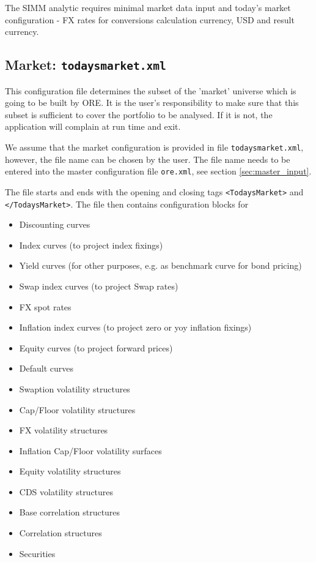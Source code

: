 \documentclass[12pt, a4paper]{article}
\begin{document}
The SIMM analytic requires minimal market data input and today's market configuration - FX rates for conversions calculation currency, USD and result currency.

\subsection{Market: {\tt todaysmarket.xml}}\label{sec:market}

This configuration file determines the subset of the 'market' universe which is going to be built by ORE. It is the
user's responsibility to make sure that this subset is sufficient to cover the portfolio to be analysed. If it is not,
the application will complain at run time and exit.

\medskip We assume that the market configuration is provided in file {\tt todaysmarket.xml}, however, the file name can
be chosen by the user. The file name needs to be entered into the master configuration file {\tt ore.xml}, see section
\ref{sec:master_input}.

\medskip 
The file starts and ends with the opening and closing tags {\tt <TodaysMarket>} 
and {\tt </TodaysMarket>}. The file then contains configuration blocks for
\begin{itemize}
\item Discounting curves
\item Index curves (to project index fixings)
\item Yield curves (for other purposes, e.g. as benchmark curve for bond pricing)
\item Swap index curves (to project Swap rates)
\item FX spot rates
\item Inflation index curves (to project zero or yoy inflation fixings)
\item Equity curves (to project forward prices)
\item Default curves
\item Swaption volatility structures
\item Cap/Floor volatility structures
\item FX volatility structures
\item Inflation Cap/Floor volatility surfaces
\item Equity volatility structures
\item CDS volatility structures
\item Base correlation structures
\item Correlation structures
\item Securities
\end{itemize}
\end{document}
